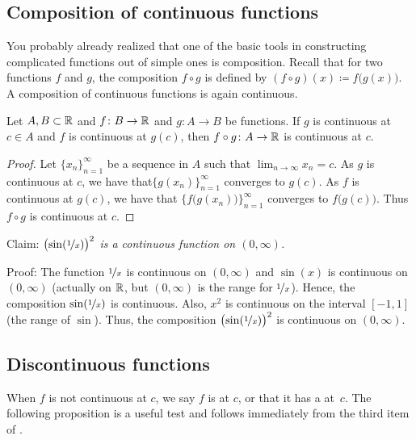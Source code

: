 \subsection{Composition of continuous functions}

You probably already realized that one of the basic tools in
constructing complicated functions out of simple ones is composition.
Recall that for two functions $f$ and $g$,
the composition $f \circ g$ is defined by
$(f \circ g)(x) \coloneqq f\bigl(g(x)\bigr)$.
A composition of
continuous functions is again
continuous.

\begin{prop} \label{prop:compositioncont}
Let $A, B \subset {\mathbb{R}}$ and $f \colon B \to {\mathbb{R}}$ and $g \colon A \to B$ be
functions.  If $g$ is continuous at $c \in A$ and
$f$ is continuous at $g(c)$, then $f \circ g \colon A \to {\mathbb{R}}$ is continuous
at $c$.
\end{prop}

\begin{proof}
Let $\{ x_n \}_{n=1}^\infty$ be a sequence in $A$ such that
$\lim_{n\to\infty} x_n = c$.
As $g$ is continuous at $c$, we have  that$\bigl\{ g(x_n) \bigr\}_{n=1}^\infty$ converges to $g(c)$.
As $f$ is continuous at $g(c)$, we have that $\bigl\{ f\bigl(g(x_n)\bigr)
\bigr\}_{n=1}^\infty$ converges
to $f\bigl(g(c)\bigr)$.
Thus $f \circ g$ is continuous at $c$.
\end{proof}

\begin{example}
Claim: \emph{${\bigl(\sin(\nicefrac{1}{x})\bigr)}^2$ is a continuous
function on $(0,\infty)$.}

Proof: The function $\nicefrac{1}{x}$ is continuous on
$(0,\infty)$ and $\sin(x)$ is continuous on $(0,\infty)$ (actually
on ${\mathbb{R}}$, but $(0,\infty)$ is the range for $\nicefrac{1}{x}$).
Hence, the composition $\sin(\nicefrac{1}{x})$ is continuous.  Also,
$x^2$ is continuous on the interval $[-1,1]$ (the range of $\sin$).
Thus, the composition
${\bigl(\sin(\nicefrac{1}{x})\bigr)}^2$ is continuous on $(0,\infty)$.
\end{example}

\subsection{Discontinuous functions}

When $f$ is not continuous at $c$, we
say $f$ is \emph{} at $c$, or that it has a
\emph{} at~$c$.
The following proposition is a useful test and follows immediately
from the third item of .

